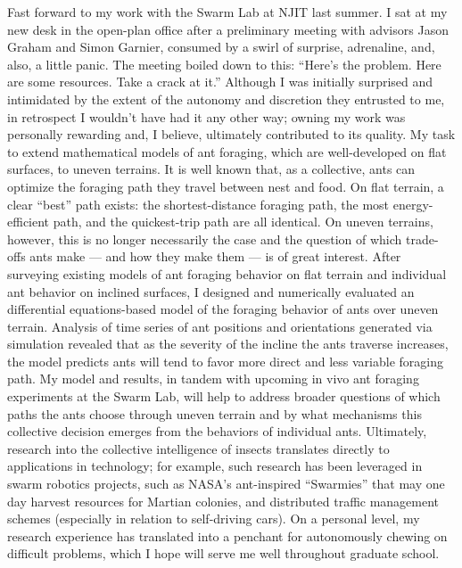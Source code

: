 \documentclass[12pt]{book}
\begin{document}
Fast forward to my work with the Swarm Lab at NJIT last summer. I sat at my new desk in the open-plan office after a preliminary meeting with advisors Jason Graham and Simon Garnier, consumed by a swirl of surprise, adrenaline, and, also, a little panic. The meeting boiled down to this: ``Here's the problem. Here are some resources. Take a crack at it.'' Although I was initially surprised and intimidated by the extent of the autonomy and discretion they entrusted to me, in retrospect I wouldn't have had it any other way; owning my work was personally rewarding and, I believe, ultimately contributed to its quality. My task to extend mathematical models of ant foraging, which are well-developed on flat surfaces, to uneven terrains. It is well known that, as a collective, ants can optimize the foraging path they travel between nest and food. On flat terrain, a clear ``best'' path exists: the shortest-distance foraging path, the most energy-efficient path, and the quickest-trip path are all identical. On uneven terrains, however, this is no longer necessarily the case and the question of which trade-offs ants make --- and how they make them --- is of great interest. After surveying existing models of ant foraging behavior on flat terrain and individual ant behavior on inclined surfaces, I designed and numerically evaluated an differential equations-based model of the foraging behavior of ants over uneven terrain. Analysis of time series of ant positions and orientations generated via simulation revealed that as the severity of the incline the ants traverse increases, the model predicts ants will tend to favor more direct and less variable foraging path. My model and results, in tandem with upcoming in vivo ant foraging experiments at the Swarm Lab, will help to address broader questions of which paths the ants choose through uneven terrain and by what mechanisms this collective decision emerges from the behaviors of individual ants. Ultimately, research into the collective intelligence of insects translates directly to applications in technology; for example, such research has been leveraged in swarm robotics projects, such as NASA's ant-inspired ``Swarmies'' that may one day harvest resources for Martian colonies, and distributed traffic management schemes (especially in relation to self-driving cars). On a personal level, my research experience has translated into a penchant for autonomously chewing on difficult problems, which I hope will serve me well throughout graduate school.

\end{document}
